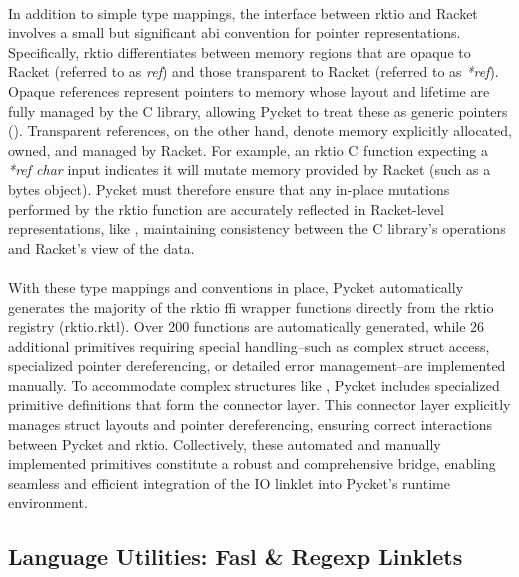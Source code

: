 				\paragraph{}%
					In addition to simple type mappings, the interface between rktio and Racket involves a small but significant \gls{abi} convention for pointer representations. Specifically, rktio differentiates between memory regions that are opaque to Racket (referred to as \emph{ref}) and those transparent to Racket (referred to as \emph{*ref}). Opaque references represent pointers to memory whose layout and lifetime are fully managed by the C library, allowing Pycket to treat these as generic pointers (). Transparent references, on the other hand, denote memory explicitly allocated, owned, and managed by Racket. For example, an rktio C function expecting a \emph{*ref char} input indicates it will mutate memory provided by Racket (such as a bytes object). Pycket must therefore ensure that any in-place mutations performed by the rktio function are accurately reflected in Racket-level representations, like , maintaining consistency between the C library's operations and Racket’s view of the data.

				\paragraph{}%
					With these type mappings and conventions in place, Pycket automatically generates the majority of the rktio \gls{ffi} wrapper functions directly from the rktio registry (rktio.rktl). Over 200 functions are automatically generated, while 26 additional primitives requiring special handling--such as complex struct access, specialized pointer dereferencing, or detailed error management--are implemented manually. To accommodate complex structures like , Pycket includes specialized primitive definitions that form the connector layer. This connector layer explicitly manages struct layouts and pointer dereferencing, ensuring correct interactions between Pycket and rktio. Collectively, these automated and manually implemented primitives constitute a robust and comprehensive bridge, enabling seamless and efficient integration of the IO linklet into Pycket's runtime environment.


		\subsection{Language Utilities: Fasl \& Regexp Linklets}

